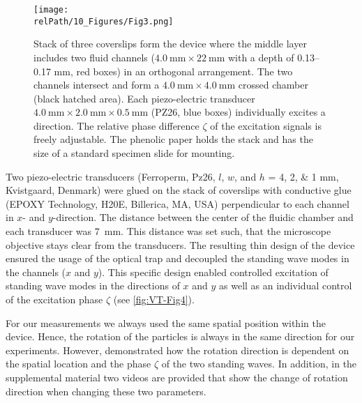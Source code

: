\begin{figure}
    \centering
    \texttt{[image: \\relPath/10\_Figures/Fig3.png]}
    \caption{Stack of three coverslips form the device where the middle layer 
        includes two fluid channels ($\SI{4.0}{\mm}\times\SI{22}{\mm}$ with a 
        depth of \numrange{0.13}{0.17} \si{\milli\meter}, red boxes) in an 
        orthogonal arrangement. The two channels intersect and form a 
        $\SI{4.0}{\mm}\times\SI{4.0}{\mm}$ crossed chamber (black hatched 
        area).  Each piezo-electric transducer 
        $\SI{4.0}{\mm}\times\SI{2.0}{\mm}\times\SI{0.5}{\mm}$ (PZ26, blue 
        boxes) individually excites a direction.  The relative phase difference 
        $\zeta$ of the excitation signals is freely adjustable.  The phenolic 
        paper holds the stack and has the size of a standard specimen slide for 
    mounting.\label{fig:VT-Fig3}}
\end{figure}

Two piezo-electric transducers (Ferroperm, Pz26, $l$, $w$, and $h$ = \numlist{4; 
2; 1} \si{\mm}, Kvistgaard, Denmark) were glued on the stack of coverslips with 
conductive glue (EPOXY Technology, H20E, Billerica, MA, USA) perpendicular to 
each channel in $x$- and $y$-direction. The distance between the center of the 
fluidic chamber and each transducer was \SI{7}{\mm}. This distance was set such, 
that the microscope objective stays clear from the transducers. The resulting 
thin design of the device ensured the usage of the optical trap and decoupled 
the standing wave modes in the channels ($x$ and $y$). This specific design 
enabled controlled excitation of standing wave modes in the directions of $x$ 
and $y$ as well as an individual control of the excitation phase $\zeta$ (see 
\cref{fig:VT-Fig4}).

For our measurements we always used the same spatial position within the device.  
Hence, the rotation of the particles is always in the same direction for our 
experiments. However, \citeauthor{Lamprecht2015} \cite{Lamprecht2015} 
demonstrated how the rotation direction is dependent on the spatial location and 
the phase $\zeta$ of the two standing waves. In addition, in the supplemental 
material two videos are provided that show the change of rotation direction when 
changing these two parameters.


